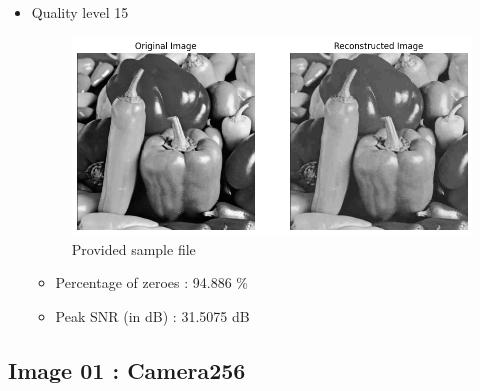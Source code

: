 \documentclass[11pt,a4paper]{article}
\begin{document}
\begin{itemize}
    \newpage



    \item Quality level 15
    {\begin{figure}[h]
        \centering
        \includegraphics[width=1.0\linewidth]{images/im3q3.png}
        \caption{Provided sample file}
    \end{figure}}

    \begin{itemize}
        \item Percentage of zeroes : 94.886 \%
        \item Peak SNR (in dB)     : 31.5075 dB
    \end{itemize}

    
\end{itemize}


\subsection{Image 01 : Camera256} 
\end{document}
